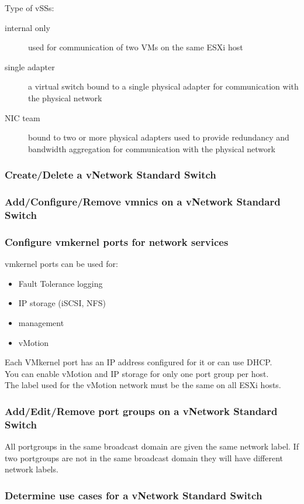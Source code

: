 Type of vSSs:

\begin{description}

\item[internal only]
used for communication of two VMs on the same ESXi host

\item[single adapter]
a virtual switch bound to a single physical adapter for communication
with the physical network

\item[NIC team]
bound to two or more physical adapters used to provide redundancy and bandwidth
aggregation for communication with the physical network

\end{description}

\subsubsection{Create/Delete a vNetwork Standard Switch}

\subsubsection{Add/Configure/Remove vmnics on a vNetwork Standard Switch}

\subsubsection{Configure vmkernel ports for network services}

vmkernel ports can be used for:

\begin{itemize}
\item Fault Tolerance logging
\item IP storage (iSCSI, NFS)
\item management
\item vMotion
\end{itemize}

Each VMkernel port has an IP address configured for it or can use DHCP.\\

You can enable vMotion and IP storage for only one port group per host.\\

The label used for the vMotion network must be the same on all ESXi hosts.

\subsubsection{Add/Edit/Remove port groups on a vNetwork Standard Switch}

All portgroups in the same broadcast domain are given the same network label.
If two portgroups are not in the same broadcast domain they will have different
network labels.

\subsubsection{Determine use cases for a vNetwork Standard Switch}
